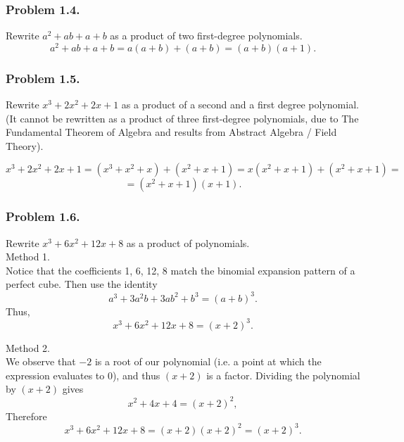 \documentclass{article}
\begin{document}
\subsubsection{Problem 1.4.}
Rewrite $a^2 + ab + a + b$ as a product of two first-degree polynomials.
\begin{equation}
    a^2 + ab + a + b = a(a+b) + (a+b) = (a + b) (a + 1).
\end{equation}

\subsubsection{Problem 1.5.}
Rewrite $x^3 + 2x^2 + 2x + 1$ as a product of a second and a first degree polynomial. (It cannot be rewritten as a product of three first-degree polynomials, due to The Fundamental Theorem of Algebra and results from Abstract Algebra / Field Theory).

\begin{equation}
    x^3 + 2x^2 + 2x + 1 = (x^3 + x^2 + x) + (x^2 + x + 1) = x(x^2 + x + 1) + (x^2 + x + 1) =
\end{equation}
\begin{equation}
    = (x^2 + x + 1)(x + 1).
\end{equation}

\subsubsection{Problem 1.6.}
Rewrite $x^3 + 6x^2 + 12x + 8$ as a product of polynomials.
\\
Method 1.\\
Notice that the coefficients 1, 6, 12, 8 match the binomial expansion pattern of a perfect cube. Then use the identity
\begin{equation}
    a^3 + 3a^2b+3ab^2+b^3 = (a+b)^3.
\end{equation}
Thus,
\begin{equation}
    x^3 + 6x^2 + 12x + 8 = (x+2)^3.
\end{equation}

Method 2.\\
We observe that $-2$ is a root of our polynomial (i.e. a point at which the expression evaluates to $0$), and thus $(x+2)$ is a factor. Dividing the polynomial by $(x+2)$ gives
\begin{equation}
    x^2 + 4x + 4 = (x+2)^2,
\end{equation}
Therefore
\begin{equation}
    x^3 + 6x^2 + 12x + 8 = (x+2)(x+2)^2 = (x+2)^3.
\end{equation}
\end{document}
